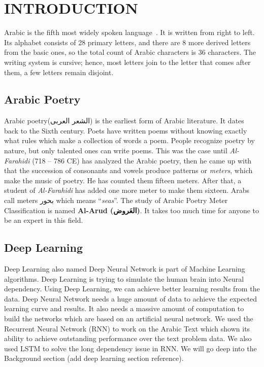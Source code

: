\chapter{\uppercase{Introduction}}\label{Ch:Intro}



 

  Arabic is the fifth most widely spoken language~\cite{Ethnologue_2017}. It is written from right to left. Its
alphabet consists of 28 primary letters, and there are 8 more derived letters
from the basic ones, so the total count of Arabic characters is 36 characters.
The writing system is cursive; hence, most letters join to the letter that comes
after them, a few letters remain disjoint.

\section{Arabic Poetry } %
Arabic poetry(\textarabic{الشعر العربى}) is the earliest form of Arabic literature. It dates back to the Sixth century. Poets have written poems without knowing exactly what rules which make a collection of words a poem. People recognize poetry by nature, but only talented ones can write poems. This was the case until \textit{Al-Farahidi} (718 – 786 CE) has analyzed the
Arabic poetry, then he came up with that the succession of consonants and vowels
produce patterns or \textit{meters}, which make the music of poetry.  He has
counted them fifteen meters.  After that, a student of \textit{Al-Farahidi} has
added one more meter to make them sixteen. Arabs call meters \textarabic{بحور}
which means ``\textit{seas}''. The study of Arabic Poetry Meter Classification is named \textbf{Al-Arud (\textarabic{العَروض})}. It takes too much time for anyone to be an expert in this field. 
\section{Deep Learning}

Deep Learning also named Deep Neural Network is part of Machine Learning algorithms. Deep Learning is trying to simulate the human brain into Neural dependency.  Using Deep Learning, we can achieve better learning results from the data. Deep Neural Network needs a huge amount of data to achieve the expected learning curve and results. It also needs a massive amount of computation to build the networks which are based on an artificial neural network. We used the Recurrent Neural Network (RNN) to work on the Arabic Text which shown its ability to achieve outstanding performance over the text problem data. We also used LSTM to solve the long dependency issue in RNN. We will go deep into the Background section (add deep learning section reference).

